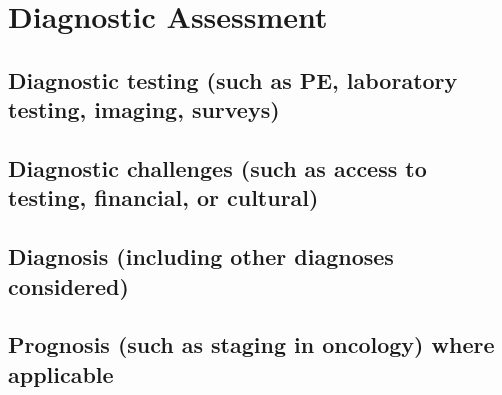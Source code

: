 \section{Diagnostic Assessment}
\subsection{Diagnostic testing (such as PE, laboratory testing, imaging, surveys)}

\subsection{Diagnostic challenges (such as access to testing, financial, or cultural)}

\subsection{Diagnosis (including other diagnoses considered)}

\subsection{Prognosis (such as staging in oncology) where applicable}






